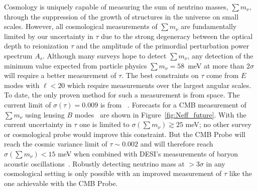 Cosmology is uniquely capable of measuring the sum of neutrino masses, $\sum m_\nu$, through the 
suppression of the growth of structures in the universe on small scales.   However, all cosmological 
measurements of $\sum m_\nu$ are fundamentally limited by our uncertainty in $\tau$ due to the strong degeneracy 
between the optical depth to reionization $\tau$ and the amplitude of the primordial perturbation power spectrum
$A_s$.  Although many surveys hope to detect $\sum m_\nu$, any detection 
of the minimum value expected from particle physics $\sum m_\nu = 58$~meV at more than $2 \sigma$ will 
require a better measurement of $\tau$.  The best constraints on $\tau$ come from $E$ modes with $\ell < 20$ which require 
measurements over the largest angular scales. To date, the only proven method for such a measurement is from space. 
The current limit of $\sigma({\tau}) = 0.009$ is from \planck~\cite{planck2016_xlvi}.  Forecasts for a
CMB measurement of $\sum m_\nu$ using lensing $B$ modes~\cite{Kaplinghat:2003bh} are shown in 
Figure~\ref{fig:Neff_future}.  With the current uncertainty in $\tau$ one is limited to  
$\sigma(\sum m_\nu) \gtrsim 25$ meV; no other survey or cosmological probe would improve this constraint.  
But the \ac{CMB} Probe will reach the cosmic variance limit of $\tau \sim 0.002$ and will therefore 
reach $\sigma(\sum m_\nu) < 15$ meV when combined with DESI's measurements of 
baryon acoustic oscillations~\cite{Levi:2013gra}.  Robustly detecting neutrino mass at  $> 3\sigma$ in any cosmological setting is 
only possible with an improved measurement of $\tau$ like the one achievable with the \ac{CMB} Probe.



